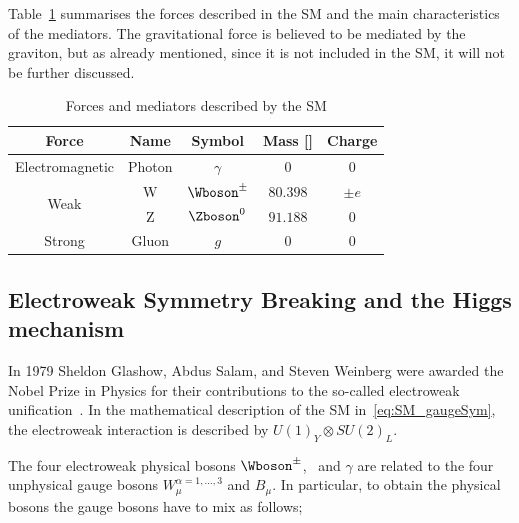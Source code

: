 			Table~\ref{tab:interactions} summarises the forces described in the \ac{SM} and the main characteristics of the mediators. The gravitational force is believed to be mediated by the graviton, but as already mentioned, since it is not included in the \ac{SM}, it will not be further discussed.

			\begin{table}[!htb]\centering\caption{Forces and mediators described by the \ac{SM}}							
				\begin{tabular}{|ccccc|}
					\hline \hline
					\textbf{Force} & \textbf{Name} & \textbf{Symbol} & \textbf{Mass} [\GeV]& \textbf{Charge} \\ \hline \hline
					Electromagnetic & Photon & $\gamma$ & 0 & 0 \\ \hline
					\multirow{2}{*}{Weak} & W & $\Wboson^{\pm}$ & $80.398$ & $\pm e$ \\
					& Z & $\Zboson^0$ & $91.188$ & 0 \\\hline
					Strong & Gluon & $g$ & $0$ & $0$ \\\hline\hline
				\end{tabular}						
			\label{tab:interactions} 
			\end{table}



		\subsection{Electroweak Symmetry Breaking and the Higgs mechanism}
		\label{sec:ewksb}

			In 1979 Sheldon Glashow, Abdus Salam, and Steven Weinberg were awarded the Nobel Prize in Physics for their contributions to the so-called electroweak unification~\cite{Glashow:1961tr,SALAM1964168,PhysRevLett.19.1264}. In the mathematical description of the \ac{SM} in~\ref{eq:SM_gaugeSym}, the electroweak interaction is described by $U(1)_Y \otimes SU(2)_L$. 

			The four electroweak physical bosons $\Wboson^{\pm}$, \Zboson\ and $\gamma$ are related to the four unphysical gauge bosons $W_{\mu}^{\alpha = 1,\dots,3}$ and $B_\mu$. In particular, to obtain the physical bosons the gauge bosons have to mix as follows;


